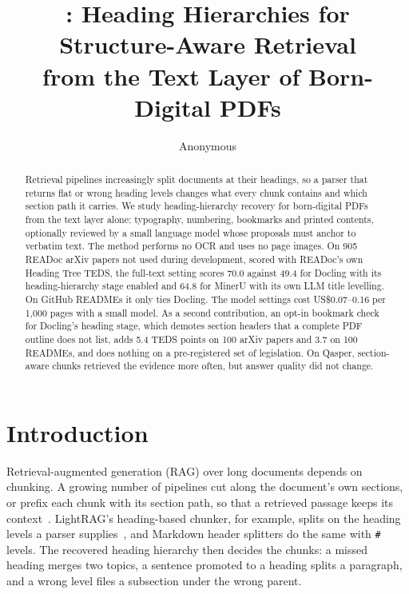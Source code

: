 \documentclass[10pt,twocolumn,letterpaper]{article}
\title{\sysname: Heading Hierarchies for Structure-Aware Retrieval\\from the Text Layer of Born-Digital PDFs}
\author{Anonymous}  %
\begin{document}
\maketitle

\begin{abstract}
Retrieval pipelines increasingly split documents at their headings, so a parser that returns flat
or wrong heading levels changes what every chunk contains and which section path it carries. We
study heading-hierarchy recovery for born-digital PDFs from the text layer alone: typography,
numbering, bookmarks and printed contents, optionally reviewed by a small language model whose
proposals must anchor to verbatim text. The method performs no OCR and uses no page images. On 905
READoc arXiv papers not used during development, scored with READoc's own Heading Tree TEDS, the
full-text setting scores 70.0 against 49.4 for Docling with its heading-hierarchy stage enabled and
64.8 for MinerU with its own LLM title levelling. On GitHub READMEs it only ties Docling. The model settings cost
US\$0.07--0.16 per 1,000 pages with a small model. As a second contribution, an opt-in bookmark check
for Docling's heading stage, which demotes section headers that a complete PDF outline does not
list, adds 5.4 TEDS points on 100 arXiv papers and 3.7 on 100 READMEs, and does nothing on a
pre-registered set of legislation. On Qasper, section-aware chunks retrieved the evidence more often,
but answer quality did not change.
\end{abstract}

\section{Introduction}
\label{sec:intro}

Retrieval-augmented generation (RAG) over long documents depends on chunking. A growing number of
pipelines cut along the document's own sections, or prefix each chunk with its section path, so that
a retrieved passage keeps its context~\cite{lu2026hichunk,anthropic2024contextual}. LightRAG's
heading-based chunker, for example, splits on the heading levels a parser supplies~\cite{guo2025lightrag,lightrag_parser_docs},
and Markdown header splitters do the same with \texttt{\#} levels. The recovered heading
hierarchy then decides the chunks: a missed heading merges two topics, a sentence promoted to a
heading splits a paragraph, and a wrong level files a subsection under the wrong parent.
\end{document}
